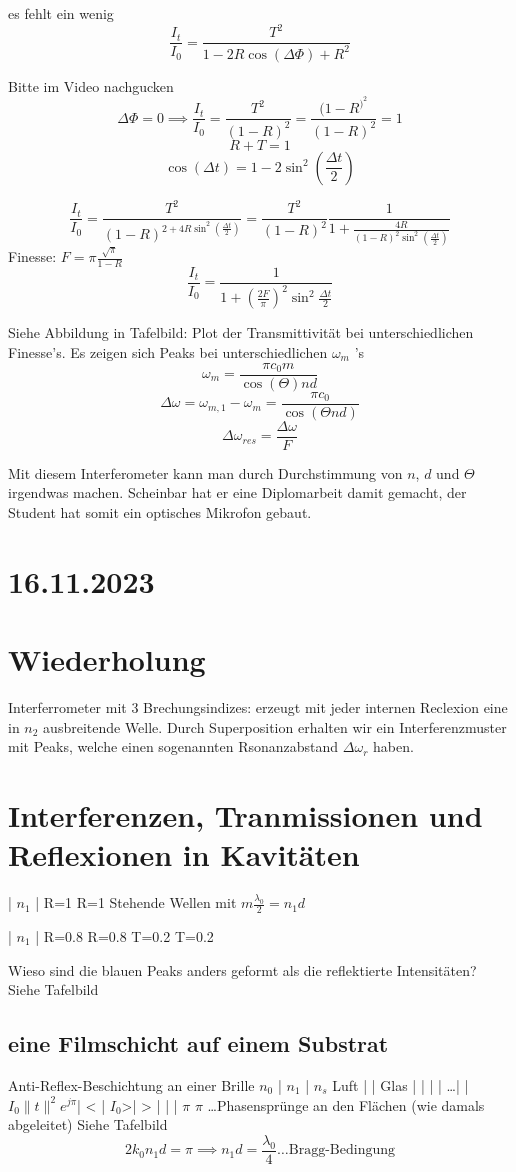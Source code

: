 \documentclass[a4paper]{article}
\begin{document}
es fehlt ein wenig
\implies 
\[ \frac{I_{t}}{I_{0}}=\frac{T^{2}}{1-2R\cos(\Delta\Phi)+R^{2}} \]

Bitte im Video nachgucken
\[ \Delta\Phi=0 \implies \frac{I_{t}}{I_{0}}=\frac{T^{2}}{(1-R)^{2}}=\frac{(1-R^)^{2}}{(1-R)^{2}}=1\]
\[ R+T=1 \]
\[ \cos(\Delta t) =1-2\sin^{2}(\frac{\Delta t}{2})\]

\[ \frac{I_{t}}{I_{0}}=\frac{T^{2}}{(1-R)^{2+4R\sin^{2}(\frac{\Delta t}{2})}}=\frac{T^{2}}{(1-R)^{2}} \frac{1}{1+\frac{4R}{(1-R)^{2}\sin^{2}(\frac{\Delta t}{2})}} \]
Finesse: $F=\pi \frac{\sqrt{\pi} }{1-R}$ 
\[ \frac{I_{t}}{I_{0}}=\frac{1}{1+(\frac{2F}{\pi})^{2}\sin^2 \frac{\Delta t}{2}} \]

Siehe Abbildung in Tafelbild: Plot der Transmittivität bei unterschiedlichen Finesse's. Es zeigen sich Peaks bei unterschiedlichen $\omega_{m}$ 's
\[ \omega_{m}=\frac{\pi c_{0}m}{\cos(\Theta)nd} \]
\[ \Delta \omega = \omega_{m,1}-\omega_{m}=\frac{\pi c_{0}}{\cos(\Theta nd)}\]
\[ \Delta\omega_{res}=\frac{\Delta\omega}{F} \]

Mit diesem Interferometer kann man durch Durchstimmung von $n$,  $d$ und  $\Theta$ irgendwas machen.
Scheinbar hat er eine Diplomarbeit damit gemacht, der Student hat somit ein optisches Mikrofon gebaut.

\section*{16.11.2023}
\section*{Wiederholung}
Interferrometer mit 3 Brechungsindizes: erzeugt mit jeder internen Reclexion eine in $n_{2}$ ausbreitende Welle.
Durch Superposition erhalten wir ein Interferenzmuster mit Peaks, welche einen sogenannten Rsonanzabstand $\Delta\omega_{r}$ haben.

\section*{Interferenzen, Tranmissionen und Reflexionen in Kavitäten}
|    $n_{1}$   |
R=1      R=1
Stehende Wellen mit $m \frac{\lambda_{0}}{2}=n_{1}d$ 


|    $n_{1}$   |
R=0.8        R=0.8
T=0.2        T=0.2

Wieso sind die blauen Peaks anders geformt als die reflektierte Intensitäten?
Siehe Tafelbild

\subsection*{eine Filmschicht auf einem Substrat}
Anti-Reflex-Beschichtung an einer Brille
$n_{0}$ | $n_{1}$ | $n_{s}$ 
Luft   |        | Glas
       |        |
       |        |
\ldots      |        |
$I_{0}\|t\|^{2}e^{j\pi}$|    <   |
$I_{0}$>|    >   |
       |        |
       $\pi$    $\pi$  \ldots Phasensprünge an den Flächen (wie damals abgeleitet)
Siehe Tafelbild
\[ 2k_{0}n_{1}d=\pi \implies n_{1}d=\frac{\lambda_{0}}{4}\text{\ldots Bragg-Bedingung}\]
\end{document}
